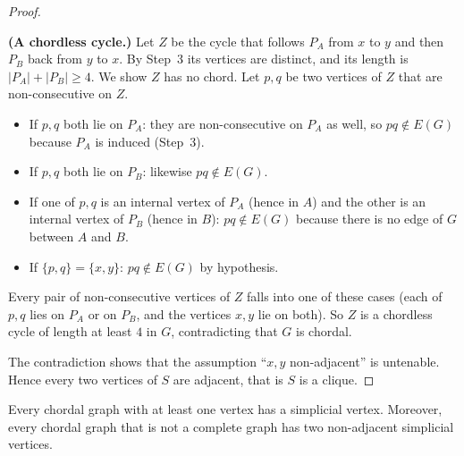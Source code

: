 \documentclass[11pt]{article}
\numberwithin{equation}{section}
\theoremstyle{plain}
\begin{document}
\begin{proof}
\begin{steps}
\item\textbf{(A chordless cycle.)}
Let $Z$ be the cycle that follows $P_A$ from $x$ to $y$ and then $P_B$ back from $y$ to
$x$. By Step~3 its vertices are distinct, and its length is $|P_A|+|P_B|\ge 4$. We show
$Z$ has no chord. Let $p,q$ be two vertices of $Z$ that are non-consecutive on $Z$.
\begin{itemize}[leftmargin=1.4em,itemsep=0.2ex]
\item If $p,q$ both lie on $P_A$: they are non-consecutive on $P_A$ as well, so
$pq\notin E(G)$ because $P_A$ is induced (Step~3).
\item If $p,q$ both lie on $P_B$: likewise $pq\notin E(G)$.
\item If one of $p,q$ is an internal vertex of $P_A$ (hence in $A$) and the other is an
internal vertex of $P_B$ (hence in $B$): $pq\notin E(G)$ because there is no edge of $G$
between $A$ and $B$.
\item If $\{p,q\}=\{x,y\}$: $pq\notin E(G)$ by hypothesis.
\end{itemize}
Every pair of non-consecutive vertices of $Z$ falls into one of these cases (each of
$p,q$ lies on $P_A$ or on $P_B$, and the vertices $x,y$ lie on both). So $Z$ is a
chordless cycle of length at least $4$ in $G$, contradicting that $G$ is chordal.
\end{steps}

The contradiction shows that the assumption ``$x,y$ non-adjacent'' is untenable. Hence
every two vertices of $S$ are adjacent, that is $S$ is a clique.
\end{proof}

\begin{lemma}\label{lem:dirac}
Every chordal graph with at least one vertex has a simplicial vertex. Moreover, every
chordal graph that is not a complete graph has two non-adjacent simplicial vertices.
\end{lemma}
\end{document}
